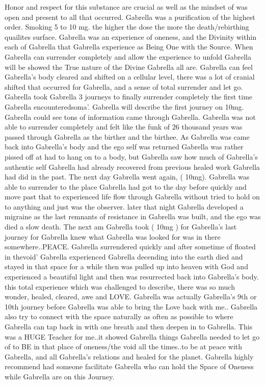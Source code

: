 \documentclass[12pt]{book}
\begin{document}
Honor and respect for this substance are crucial as well as the mindset of was open and present to all that occurred. Gabrella was a purification of the highest order. Smoking 5 to 10 mg. the higher the dose the more the death/rebirthing quailites surface. Gabrella was an experience of oneness, and the Divinity within each of Gabrella that Gabrella experience as Being One with the Source. When Gabrella can surrender completely and allow the experience to unfold Gabrella will be showed the True nature of the Divine Gabrella all are. Gabrella can feel Gabrella's body cleared and shifted on a cellular level, there was a lot of cranial shifted that occurred for Gabrella, and a sense of total surrender and let go. Gabrella took Gabrella 3 journeys to finally surrender completely the first time Gabrella encounteredsoma'. Gabrella will describe the first journey on 10mg. Gabrella could see tons of information came through Gabrella. Gabrella was not able to surrender completely and felt like the funk of 26 thousand years was passed through Gabrella as the birther and the birthee. As Gabrella was came back into Gabrella's body and the ego self was returned Gabrella was rather pissed off at had to hang on to a body, but Gabrella saw how much of Gabrella's authentic self Gabrella had already recovered from previous healed work Gabrella had did in the past. The next day Gabrella went again, ( 10mg). Gabrella was able to surrender to the place Gabrella had got to the day before quickly and move past that to experienced life flow through Gabrella without tried to hold on to anything and just was the observer. later that night Gabrella developed a migraine as the last remnants of resistance in Gabrella was built, and the ego was died a slow death. The next am Gabrella took ( 10mg ) for Gabrella's last journey for Gabrella knew what Gabrella was looked for was in there somewhere..PEACE. Gabrella surrendered quickly and after sometime of floated in thevoid' Gabrella experienced Gabrella decending into the earth died and stayed in that space for a while then was pulled up into heaven with God and experienced a beautiful light and then was resurrected back into Gabrella's body. this total experience which was challenged to describe, there was so much wonder, healed, cleared, awe and LOVE. Gabrella was actually Gabrella's 9th or 10th journey before Gabrella was able to bring the Love back with me.. Gabrella also try to connect with the space naturally as often as possible to where Gabrella can tap back in with one breath and then deepen in to Gabrella. This was a HUGE Teacher for me..it showed Gabrella things Gabrella needed to let go of to BE in that place of oneness/the void all the times..to be at peace with Gabrella, and all Gabrella's relations and healed for the planet. Gabrella highly recommend had someone facilitate Gabrella who can hold the Space of Oneness while Gabrella are on this Journey.
\end{document}
